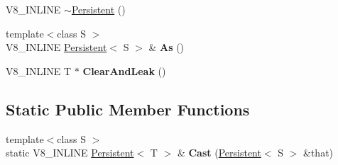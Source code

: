 \begin{DoxyCompactItemize}
\item 
V8\-\_\-\-I\-N\-L\-I\-N\-E \hyperlink{classv8_1_1Persistent_a7d4d2bebfe3919e447e22adc15464e25}{$\sim$\-Persistent} ()
\item 
\hypertarget{classv8_1_1Persistent_a8d2c96e559ac88f6201d98cb2a626808}{{\footnotesize template$<$class S $>$ }\\V8\-\_\-\-I\-N\-L\-I\-N\-E \hyperlink{classv8_1_1Persistent}{Persistent}$<$ S $>$ \& {\bfseries As} ()}\label{classv8_1_1Persistent_a8d2c96e559ac88f6201d98cb2a626808}

\item 
\hypertarget{classv8_1_1Persistent_ab114b358e4eb09025ef3ca9152e684a3}{V8\-\_\-\-I\-N\-L\-I\-N\-E T $\ast$ {\bfseries Clear\-And\-Leak} ()}\label{classv8_1_1Persistent_ab114b358e4eb09025ef3ca9152e684a3}

\end{DoxyCompactItemize}
\subsection*{Static Public Member Functions}
\begin{DoxyCompactItemize}
\item 
\hypertarget{classv8_1_1Persistent_aa20fd9af0b410df9e887689ef97c28dd}{{\footnotesize template$<$class S $>$ }\\static V8\-\_\-\-I\-N\-L\-I\-N\-E \hyperlink{classv8_1_1Persistent}{Persistent}$<$ T $>$ \& {\bfseries Cast} (\hyperlink{classv8_1_1Persistent}{Persistent}$<$ S $>$ \&that)}\label{classv8_1_1Persistent_aa20fd9af0b410df9e887689ef97c28dd}

\end{DoxyCompactItemize}
